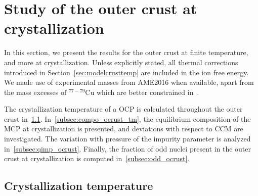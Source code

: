 \section{Study of the outer crust at crystallization}

In this section, we present the results for the outer crust at finite
temperature, and more at crystallization.
Unless explicitly stated, all thermal corrections introduced in
Section~\ref{sec:modelcrusttemp} are included in the ion free energy.
We made use of experimental masses from AME2016 \cite{Huang2017} when 
available, apart from the mass excesses of $^{77-79}$Cu which are better 
constrained in~\cite{Welker2017}.

The crystallization temperature of a OCP is calculated throughout the outer
crust in~\ref{subsec:tm_ocrust}. In~\ref{subsec:compo_ocrust_tm}, the
equilibrium composition of the MCP at crystallization is presented, and 
deviations with respect to CCM are investigated. The variation with pressure of 
the impurity parameter is analyzed in~\ref{subsec:qimp_ocrust}. Finally, the 
fraction of odd nuclei present in the outer crust at crystallization is 
computed in~\ref{subsec:odd_ocrust}.

\subsection{Crystallization temperature}\label{subsec:tm_ocrust}

